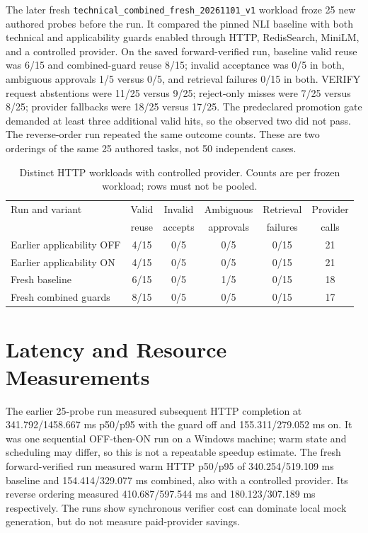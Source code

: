 The later fresh \texttt{technical\_combined\_fresh\_20261101\_v1} workload froze 25 new authored probes before the run. It compared the pinned NLI baseline with both technical and applicability guards enabled through HTTP, RedisSearch, MiniLM, and a controlled provider. On the saved forward-verified run, baseline valid reuse was 6/15 and combined-guard reuse 8/15; invalid acceptance was 0/5 in both, ambiguous approvals 1/5 versus 0/5, and retrieval failures 0/15 in both. VERIFY request abstentions were 11/25 versus 9/25; reject-only misses were 7/25 versus 8/25; provider fallbacks were 18/25 versus 17/25. The predeclared promotion gate demanded at least three additional valid hits, so the observed two did not pass. The reverse-order run repeated the same outcome counts. These are two orderings of the same 25 authored tasks, not 50 independent cases.

\begin{table}[htbp]\centering\footnotesize
\caption{Distinct HTTP workloads with controlled provider. Counts are per frozen workload; rows must not be pooled.}\label{tab:answer_http}
\begin{tabular}{p{3.3cm}ccccc}\toprule
Run and variant & Valid & Invalid & Ambiguous & Retrieval & Provider \\
 & reuse & accepts & approvals & failures & calls \\\midrule
Earlier applicability OFF & 4/15 & 0/5 & 0/5 & 0/15 & 21 \\
Earlier applicability ON & 4/15 & 0/5 & 0/5 & 0/15 & 21 \\
Fresh baseline & 6/15 & 0/5 & 1/5 & 0/15 & 18 \\
Fresh combined guards & 8/15 & 0/5 & 0/5 & 0/15 & 17 \\\bottomrule
\end{tabular}
\end{table}

\section{Latency and Resource Measurements}
The earlier 25-probe run measured subsequent HTTP completion at 341.792/1458.667 ms p50/p95 with the guard off and 155.311/279.052 ms on. It was one sequential OFF-then-ON run on a Windows machine; warm state and scheduling may differ, so this is not a repeatable speedup estimate. The fresh forward-verified run measured warm HTTP p50/p95 of 340.254/519.109 ms baseline and 154.414/329.077 ms combined, also with a controlled provider. Its reverse ordering measured 410.687/597.544 ms and 180.123/307.189 ms respectively. The runs show synchronous verifier cost can dominate local mock generation, but do not measure paid-provider savings.


